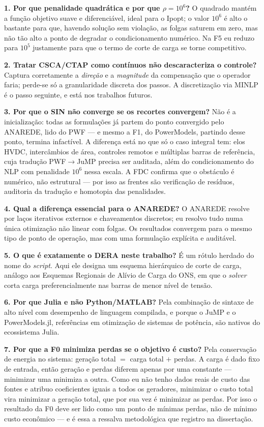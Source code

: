 \documentclass[11pt,a4paper]{article}
\begin{document}
\textbf{1. Por que penalidade quadrática e por que $\rho = 10^6$?} O quadrado mantém a função objetivo suave e diferenciável, ideal para o Ipopt; o valor $10^6$ é alto o bastante para que, havendo solução sem violação, as folgas saturem em zero, mas não tão alto a ponto de degradar o condicionamento numérico. Na F5 eu reduzo para $10^5$ justamente para que o termo de corte de carga se torne competitivo.

\textbf{2. Tratar CSCA/CTAP como contínuos não descaracteriza o controle?} Captura corretamente a \emph{direção} e a \emph{magnitude} da compensação que o operador faria; perde-se só a granularidade discreta dos passos. A discretização via MINLP é o passo seguinte, e está nos trabalhos futuros.

\textbf{3. Por que o SIN não converge se os recortes convergem?} Não é a inicialização: todas as formulações já partem do ponto convergido pelo ANAREDE, lido do PWF --- e mesmo a F1, do PowerModels, partindo desse ponto, termina infactível. A diferença está no que só o caso integral tem: elos HVDC, intercâmbios de área, controles remotos e múltiplas barras de referência, cuja tradução PWF$\to$JuMP precisa ser auditada, além do condicionamento do NLP com penalidade $10^6$ nessa escala. A FDC confirma que o obstáculo é numérico, não estrutural --- por isso as frentes são verificação de resíduos, auditoria da tradução e homotopia das penalidades.

\textbf{4. Qual a diferença essencial para o ANAREDE?} O ANAREDE resolve por laços iterativos externos e chaveamentos discretos; eu resolvo tudo numa única otimização não linear com folgas. Os resultados convergem para o mesmo tipo de ponto de operação, mas com uma formulação explícita e auditável.

\textbf{5. O que é exatamente o DERA neste trabalho?} É um rótulo herdado do nome do \textit{script}. Aqui ele designa um esquema hierárquico de corte de carga, análogo aos Esquemas Regionais de Alívio de Carga do ONS, em que o \textit{solver} corta carga preferencialmente nas barras de menor nível de tensão.

\textbf{6. Por que Julia e não Python/MATLAB?} Pela combinação de sintaxe de alto nível com desempenho de linguagem compilada, e porque o JuMP e o PowerModels.jl, referências em otimização de sistemas de potência, são nativos do ecossistema Julia.

\textbf{7. Por que a F0 minimiza perdas se o objetivo é custo?} Pela conservação de energia no sistema: geração total $=$ carga total $+$ perdas. A carga é dado fixo de entrada, então geração e perdas diferem apenas por uma constante --- minimizar uma minimiza a outra. Como eu não tenho dados reais de custo das fontes e atribuo coeficientes iguais a todos os geradores, minimizar o custo total vira minimizar a geração total, que por sua vez é minimizar as perdas. Por isso o resultado da F0 deve ser lido como um ponto de mínimas perdas, não de mínimo custo econômico --- e é essa a ressalva metodológica que registro na dissertação.
\end{document}
